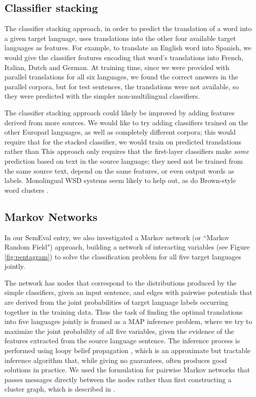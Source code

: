 \subsection{Classifier stacking}
The classifier stacking approach, in order to predict the translation of a word
into a given target language, uses translations into the other four available
target languages as features.
For example, to translate an English word into Spanish, we would give the
classifier features encoding that word's translations into French, Italian,
Dutch and German.
At training time, since we were provided with parallel translations for all six
languages, we found the correct answers in the parallel corpora, but for test
sentences, the translations were not available, so they were predicted with the
simpler non-multilingual classifiers.

The classifier stacking approach could likely be improved by adding features
derived from more sources.
We would like to try adding classifiers trained on the other Europarl
languages, as well as completely different corpora; this would require that for
the stacked classifier, we would train on predicted translations rather than
This approach only requires that the first-layer classifiers make \emph{some}
prediction based on text in the source language;
they need not be trained from the same source text, depend on the same
features, or even output words as labels. Monolingual WSD systems seem likely
to help out, as do Brown-style word clusters \cite{brown1992class}.

\subsection{Markov Networks}
In our SemEval entry, we also investigated a Markov network (or ``Markov Random
Field") approach, building a network of interacting variables (see Figure
\ref{fig:pentagram}) to solve the classification problem for all five target
languages jointly.

The network has nodes that correspond to the distributions produced by the
simple classifiers, given an input sentence, and edges with pairwise potentials
that are derived from the joint probabilities of target language labels
occurring together in the training data. 
Thus the task of finding the optimal translations into five languages jointly
is framed as a MAP inference problem, where we try to maximize the joint
probability of all five variables, given the evidence of the features extracted
from the source language sentence.
The inference process is performed using loopy belief propagation
\cite{DBLP:conf/uai/MurphyWJ99}, which is an approximate but tractable
inference algorithm that, while giving no guarantees, often produces good
solutions in practice.
We used the formulation for pairwise Markov networks that passes messages
directly between the nodes rather than first constructing a cluster graph,
which is described in \cite[\S 11.3.5.1]{Koller+Friedman:09}.

